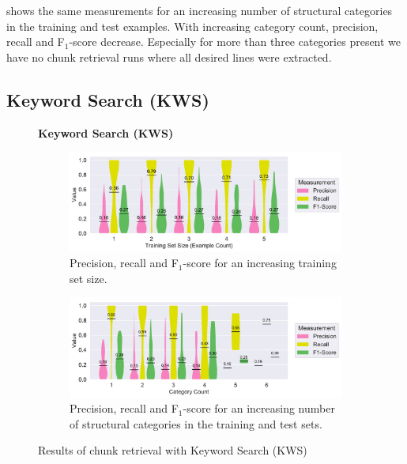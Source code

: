  shows the same
measurements for an increasing number of structural categories in the
training and test examples.
With increasing category count, precision,
recall and F$_{1}$-score decrease.
Especially for more than three
categories present we have no chunk retrieval runs where all desired
lines were extracted.

\subsection{Keyword Search (KWS)}
\label{sec:r:kws}
\begin{figure}
\centering
    \textbf{Keyword Search (KWS)}\par\medskip
\begin{subfigure}[b]{\columnwidth}
		\centering
		\includegraphics[width=\columnwidth,
		clip]{img/big-study/recall-precision-examplecount-KWS.pdf}
		\caption{Precision, recall and F$_{1}$-score for an
		increasing training set size.}
		\label{fig:recall-precision-examplecount-KWS}
\end{subfigure}\hspace{\fill}
\begin{subfigure}[b]{\columnwidth}
		\centering
		\includegraphics[width=\columnwidth,
		clip]{img/big-study/recall-precision-categorycount-KWS.pdf}
		\caption{Precision, recall and F$_{1}$-score for
		an increasing number of structural categories in the
		training and test sets.}
		\label{fig:recall-precision-categorycount-KWS}
\end{subfigure}
\caption{Results of chunk retrieval with Keyword Search (KWS)}
\end{figure}


